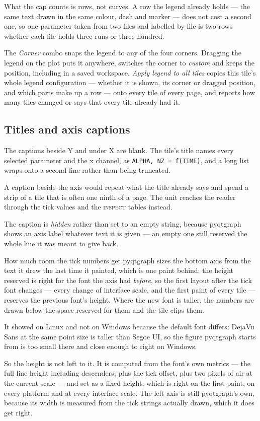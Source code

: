 \documentclass[11pt,a4paper,oneside]{report}
\newcommand{\code}[1]{\texttt{#1}}
\newcommand{\tab}[1]{\textsc{#1}}
\begin{document}
What the cap counts is rows, not curves. A row the legend already holds ---
the same text drawn in the same colour, dash and marker --- does not cost a
second one, so one parameter taken from two files and labelled by file is two
rows whether each file holds three runs or three hundred.

The \emph{Corner} combo snaps the legend to any of the four corners. Dragging the
legend on the plot puts it anywhere, switches the corner to \emph{custom} and
keeps the position, including in a saved workspace. \emph{Apply legend to all
tiles} copies this tile's whole legend configuration --- whether it is shown, its
corner or dragged position, and which parts make up a row --- onto every tile of
every page, and reports how many tiles changed or says that every tile already
had it.

\subsection{Titles and axis captions}

The captions beside Y and under X are blank. The tile's title names every
selected parameter and the x channel, as \code{ALPHA, NZ = f(TIME)}, and a long
list wraps onto a second line rather than being truncated.

A caption beside the axis would repeat what the title already says and spend a
strip of a tile that is often one ninth of a page. The unit reaches the reader
through the tick values and the \tab{inspect} tables instead.

The caption is \emph{hidden} rather than set to an empty string, because
pyqtgraph shows an axis label whatever text it is given --- an empty one still
reserved the whole line it was meant to give back.

\begin{aoenote}{How much room the tick numbers get}
pyqtgraph sizes the bottom axis from the text it drew the last time it painted,
which is one paint behind: the height reserved is right for the font the axis
had \emph{before}, so the first layout after the tick font changes --- every
change of interface scale, and the first paint of every tile --- reserves the
previous font's height. Where the new font is taller, the numbers are drawn
below the space reserved for them and the tile clips them.

It showed on Linux and not on Windows because the default font differs: DejaVu
Sans at the same point size is taller than Segoe UI, so the figure pyqtgraph
starts from is too small there and close enough to right on Windows.

So the height is not left to it. It is computed from the font's own metrics ---
the full line height including descenders, plus the tick offset, plus two
pixels of air at the current scale --- and set as a fixed height, which is right
on the first paint, on every platform and at every interface scale. The left
axis is still pyqtgraph's own, because its width is measured from the tick
strings actually drawn, which it does get right.
\end{aoenote}
\end{document}
